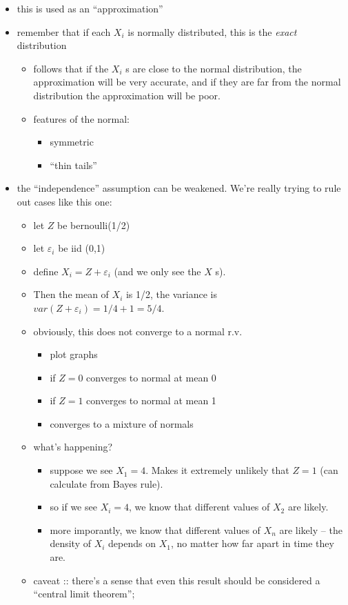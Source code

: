 \begin{itemize}
\item this is used as an ``approximation''
\item remember that if each $X_i$ is normally distributed, this is the
       \emph{exact} distribution
\begin{itemize}
\item follows that if the $X_i$ s are close to the normal
         distribution, the approximation will be very accurate, and if
         they are far from the normal distribution the approximation
         will be poor.
\item features of the normal:
\begin{itemize}
\item symmetric
\item ``thin tails''
\end{itemize}
\end{itemize}
\item the ``independence'' assumption can be weakened.  We're really
       trying to rule out cases like this one:
\begin{itemize}
\item let $Z$ be bernoulli(1/2)
\item let $\varepsilon_i$ be iid (0,1)
\item define $X_i = Z + \varepsilon_i$ (and we only see the $X$ s).
\item Then the mean of $X_i$ is 1/2, the variance is $var(Z +
         \varepsilon_i) = 1/4 + 1 = 5/4$.
\item obviously, this does not converge to a normal r.v.
\begin{itemize}
\item plot graphs
\item if $Z = 0$ converges to normal at mean 0
\item if $Z = 1$ converges to normal at mean 1
\item converges to a mixture of normals
\end{itemize}
\item what's happening?
\begin{itemize}
\item suppose we see $X_1 = 4$.  Makes it extremely unlikely that
           $Z = 1$ (can calculate from Bayes rule).
\item so if we see $X_i = 4$, we know that different values of
           $X_2$ are likely.
\item more imporantly, we know that different values of $X_n$ are
           likely -- the density of $X_i$ depends on $X_1$, no matter
           how far apart in time they are.
\end{itemize}
\item caveat :: there's a sense that even this result should be
                   considered a ``central limit theorem'';
\end{itemize}
\end{itemize}
